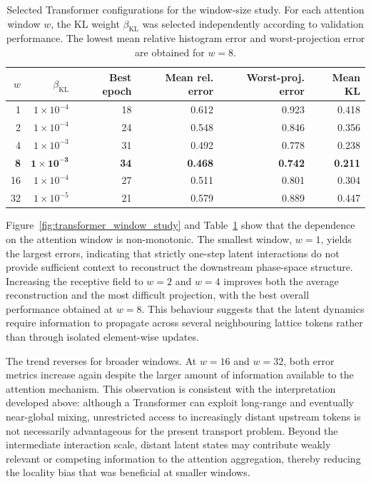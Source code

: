 \begin{table}[htbp]
\centering
\caption{
Selected Transformer configurations for the window-size study. For each attention window $w$, the KL weight $\beta_{\mathrm{KL}}$ was selected independently according to validation performance. The lowest mean relative histogram error and worst-projection error are obtained for $w=8$.
}
\label{tab:transformer_window_study}
\begin{tabular}{rrrrrr}
\toprule
$w$
&
$\beta_{\mathrm{KL}}$
&
Best epoch
&
Mean rel. error
&
Worst-proj. error
&
Mean KL
\\
\midrule
1
&
$1\times10^{-4}$
&
18
&
0.612
&
0.923
&
0.418
\\
2
&
$1\times10^{-4}$
&
24
&
0.548
&
0.846
&
0.356
\\
4
&
$1\times10^{-3}$
&
31
&
0.492
&
0.778
&
0.238
\\
\textbf{8}
&
$\mathbf{1\times10^{-3}}$
&
\textbf{34}
&
\textbf{0.468}
&
\textbf{0.742}
&
\textbf{0.211}
\\
16
&
$1\times10^{-4}$
&
27
&
0.511
&
0.801
&
0.304
\\
32
&
$1\times10^{-5}$
&
21
&
0.579
&
0.889
&
0.447
\\
\bottomrule
\end{tabular}
\end{table}

Figure~\ref{fig:transformer_window_study} and Table~\ref{tab:transformer_window_study} show that the dependence on the attention window is non-monotonic. The smallest window, $w=1$, yields the largest errors, indicating that strictly one-step latent interactions do not provide sufficient context to reconstruct the downstream phase-space structure. Increasing the receptive field to $w=2$ and $w=4$ improves both the average reconstruction and the most difficult projection, with the best overall performance obtained at $w=8$. This behaviour suggests that the latent dynamics require information to propagate across several neighbouring lattice tokens rather than through isolated element-wise updates.

The trend reverses for broader windows. At $w=16$ and $w=32$, both error metrics increase again despite the larger amount of information available to the attention mechanism. This observation is consistent with the interpretation developed above: although a Transformer can exploit long-range and eventually near-global mixing, unrestricted access to increasingly distant upstream tokens is not necessarily advantageous for the present transport problem. Beyond the intermediate interaction scale, distant latent states may contribute weakly relevant or competing information to the attention aggregation, thereby reducing the locality bias that was beneficial at smaller windows.

